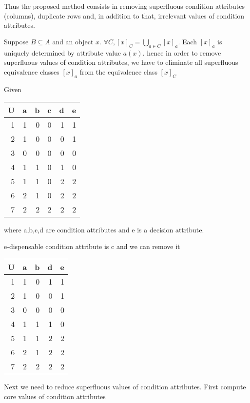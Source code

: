 \documentclass[11pt]{article}
\begin{document}
Thus the proposed method consists in removing superfluous condition
attributes (columns), duplicate rows and, in addition to that, irrelevant
values of condition attributes.


Suppose \(B\subseteq A\) and an object \(x\). \(\forall C,
   [x]_C=\displaystyle\bigcup_{a\in C}[x]_a\). Each \([x]_a\) is uniquely determined by
attribute value \(a(x)\). hence in order to remove superfluous values of
condition attributes, we have to eliminate all superfluous equivalence
classes \([x]_a\) from the equivalence class \([x]_C\) 

Given 
\begin{center}
\begin{tabular}{rrrrrr}
U & a & b & c & d & e\\
\hline
1 & 1 & 0 & 0 & 1 & 1\\
2 & 1 & 0 & 0 & 0 & 1\\
3 & 0 & 0 & 0 & 0 & 0\\
4 & 1 & 1 & 0 & 1 & 0\\
5 & 1 & 1 & 0 & 2 & 2\\
6 & 2 & 1 & 0 & 2 & 2\\
7 & 2 & 2 & 2 & 2 & 2\\
\end{tabular}
\end{center}
where a,b,c,d are condition attributes and e is a decision attribute.

e-dispensable condition attribute is c and we can remove it
\begin{center}
\begin{tabular}{rrrrr}
U & a & b & d & e\\
\hline
1 & 1 & 0 & 1 & 1\\
2 & 1 & 0 & 0 & 1\\
3 & 0 & 0 & 0 & 0\\
4 & 1 & 1 & 1 & 0\\
5 & 1 & 1 & 2 & 2\\
6 & 2 & 1 & 2 & 2\\
7 & 2 & 2 & 2 & 2\\
\end{tabular}
\end{center}
Next we need to reduce superfluous values of condition attributes. First
compute core values of condition attributes
\end{document}
